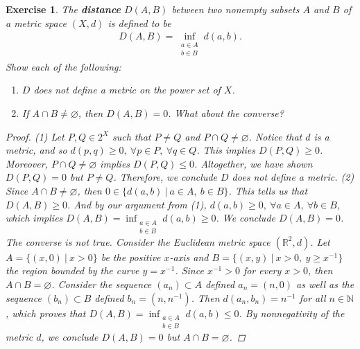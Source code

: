 \documentclass[11pt]{article}
\theoremstyle{mystyle}
\newtheorem{protoexer}{Exercise}[section]
\newenvironment{exer}
{\colorlet{shadecolor}{blue!15}\begin{shaded}\begin{protoexer}}
{\end{protoexer}\end{shaded}}
\begin{document}
\begin{exer}
The \textbf{distance} $D(A, B)$ between two nonempty subsets $A$ and $B$ of a metric space $(X, d)$ is defined to be 
\begin{align*}
   D(A, B) = \inf_{\substack{a \in A\\b \in B}} d(a, b). 
\end{align*}
Show each of the following:
\begin{enumerate}
    \item $D$ does \textit{not} define a metric on the power set of $X$.
    \item If $A \cap B \neq \varnothing$, then $D(A, B) = 0$. What about the converse?
\end{enumerate}

\begin{proof}
(1) Let $P, Q \in 2^X$ such that $P \neq Q$ and $P \cap Q \neq 
\varnothing$. Notice that $d$ is a metric, and so $d(p, q) \geq 0, \ \forall p \in P, \ \forall q \in Q$. This implies $D(P, Q) \geq 0$. Moreover, $P \cap Q \neq \varnothing$ implies $D(P, Q) \leq 0$. Altogether, we have shown $D(P, Q) = 0$ but $P \neq Q$. Therefore, we conclude $D$ does not define a metric.\newline
(2) Since $A \cap B \neq \varnothing$, then $0 \in \{ d(a, b) \ | \ a \in A, \ b \in B\}$. This tells us that $D(A, B) \geq 0$. And by our argument from (1), $d(a, b) \geq 0, \ \forall a \in A, \ \forall b \in B$, which implies $D(A, B) = \inf_{\substack{a \in A\\b \in B}} d(a, b) \geq 0$. We conclude $D(A, B) = 0$.\newline
The converse is not true. Consider the Euclidean metric space $(\mathbb{R}^2, d)$. Let $A = \{(x, 0) \ | \ x > 0 \}$ be the positive $x$-axis and $B = \{(x, y) \ | \ x >0, \ y \geq x^{-1} \}$ the region bounded by the curve $y = x^{-1}$. Since $x^{-1} > 0$ for every $x > 0$, then $A \cap B = \varnothing$. Consider the sequence $(a_n) \subset A$ defined $a_n = (n, 0)$ as well as the sequence $(b_n) \subset B$ defined $b_n = (n, n^{-1})$. Then $d(a_n, b_n) = n^{-1}$ for all $n \in \mathbb{N}$, which proves that $D(A, B) = \inf_{\substack{a \in A\\b \in B}} d(a, b) \leq 0$. By nonnegativity of the metric $d$, we conclude $D(A, B) = 0$ but $A \cap B = \varnothing$.
\end{proof}

\begin{center}
\end{center}
\end{exer}
\end{document}
